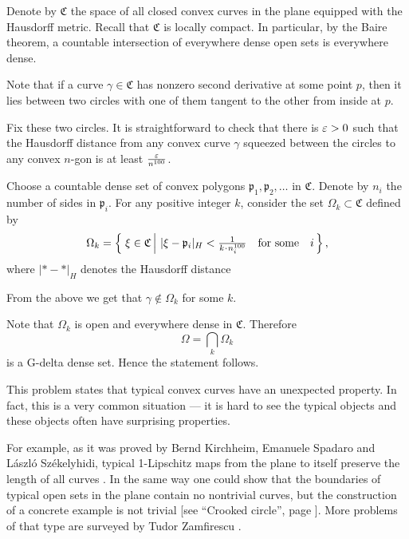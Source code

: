 Denote by $\mathfrak{C}$ the space of all closed convex curves in the plane equipped with the Hausdorff metric.
Recall that $\mathfrak{C}$ is locally compact.
In particular, by the Baire theorem, a countable intersection of everywhere dense open sets is everywhere dense.

Note that if a curve $\gamma\in\mathfrak{C}$ 
has nonzero second derivative at some point $p$,
then it lies between two circles with one of them tangent to the other from inside at $p$.

Fix these two circles.
It is straightforward to check that there is $\varepsilon>0$ such that 
the Hausdorff distance from any convex curve $\gamma$ squeezed between the circles 
to any convex $n$-gon is at least $\frac{\varepsilon}{n^{100}}$.

Choose a countable dense set of convex polygons $\mathfrak{p}_1,\mathfrak{p}_2,\dots$ in $\mathfrak{C}$.
Denote by $n_i$ the number of sides in $\mathfrak{p}_i$.
For any positive integer $k$,
consider the set $\Omega_k\subset\mathfrak{C}$ defined by 
\[\Omega_k
=
\set{\xi\in \mathfrak{C}}{|\xi-\mathfrak{p}_i|_{H}<\tfrac1{k\cdot n_i^{100}}\quad\text{for some}\quad i},\]
where $|{*}-{*}|_H$ denotes the Hausdorff distance 

From the above we get that $\gamma\notin\Omega_k$ for some $k$. 

Note that $\Omega_k$ is open and everywhere dense in $\mathfrak{C}$.
Therefore 
\[\Omega=\bigcap_k\Omega_k\]
is a G-delta dense set.
Hence the statement follows.\qeds

This problem states that typical convex curves have an unexpected property.
In fact, this is a very common situation --- it is hard to see the typical objects and these objects often have surprising properties.

For example, as it was proved by
Bernd Kirchheim, 
Emanuele Spadaro 
and 
L{\'a}szl{\'o} Sz{\'e}kelyhidi,
typical 1-Lipschitz maps from the plane to itself preserve the length of all curves \cite{KSS}.
In the same way one could show that the boundaries of typical open sets in the plane contain no nontrivial curves, 
but the construction of a concrete example is not trivial
[see ``Crooked circle'', page \pageref{Crooked circle}].
More problems of that type are surveyed by Tudor Zamfirescu \cite{zamfirescu}.







